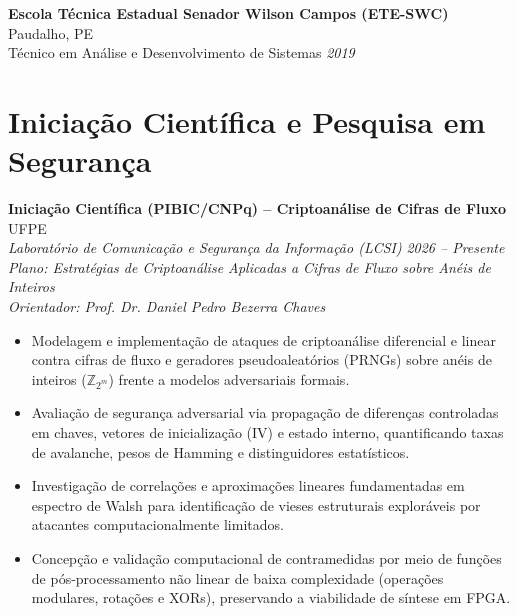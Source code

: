 \documentclass[11pt,a4paper]{article}
\begin{document}
\vspace{0.2cm}

\textbf{Escola Técnica Estadual Senador Wilson Campos (ETE-SWC)} \hfill Paudalho, PE \\
Técnico em Análise e Desenvolvimento de Sistemas \hfill \textit{2019}

\section*{Iniciação Científica e Pesquisa em Segurança}

\textbf{Iniciação Científica (PIBIC/CNPq) -- Criptoanálise de Cifras de Fluxo} \hfill UFPE \\
\textit{Laboratório de Comunicação e Segurança da Informação (LCSI)} \hfill \textit{2026 -- Presente} \\
\textit{Plano: Estratégias de Criptoanálise Aplicadas a Cifras de Fluxo sobre Anéis de Inteiros} \\
\textit{Orientador: Prof. Dr. Daniel Pedro Bezerra Chaves}
\begin{itemize}[leftmargin=*, noitemsep]
    \item Modelagem e implementação de ataques de criptoanálise diferencial e linear contra cifras de fluxo e geradores pseudoaleatórios (PRNGs) sobre anéis de inteiros ($\mathbb{Z}_{2^m}$) frente a modelos adversariais formais.
    \item Avaliação de segurança adversarial via propagação de diferenças controladas em chaves, vetores de inicialização (IV) e estado interno, quantificando taxas de avalanche, pesos de Hamming e distinguidores estatísticos.
    \item Investigação de correlações e aproximações lineares fundamentadas em espectro de Walsh para identificação de vieses estruturais exploráveis por atacantes computacionalmente limitados.
    \item Concepção e validação computacional de contramedidas por meio de funções de pós-processamento não linear de baixa complexidade (operações modulares, rotações e XORs), preservando a viabilidade de síntese em FPGA.
\end{itemize}

\vspace{0.25cm}
\end{document}

